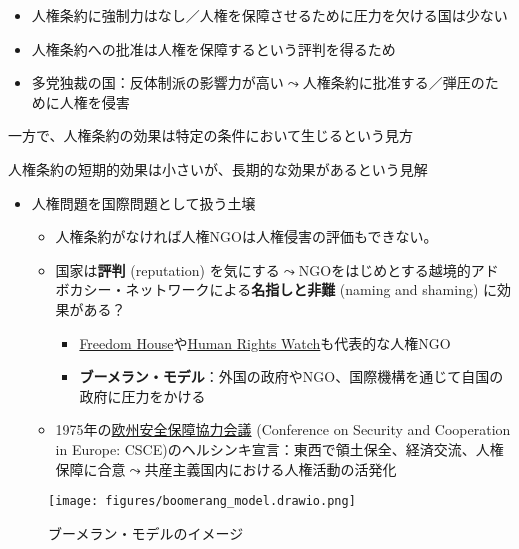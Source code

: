 \documentclass[
  xelatex,
  ja=standard]{bxjsarticle}
\providecommand{\tightlist}{%
  \setlength{\itemsep}{0pt}\setlength{\parskip}{0pt}}\usepackage{longtable,booktabs,array}
\begin{document}
\begin{itemize}
\tightlist
\item
  人権条約に強制力はなし／人権を保障させるために圧力を欠ける国は少ない
\item
  人権条約への批准は人権を保障するという評判を得るため
\item
  多党独裁の国：反体制派の影響力が高い\(\leadsto\)人権条約に批准する／弾圧のために人権を侵害
\end{itemize}

一方で、人権条約の効果は特定の条件において生じるという見方\citep{neumayer2005, murdie2012, conrad2013, lupu2013}

人権条約の短期的効果は小さいが、長期的な効果があるという見解\citep{hafner2007, tsutsui2012}

\begin{itemize}
\tightlist
\item
  人権問題を国際問題として扱う土壌

  \begin{itemize}
  \tightlist
  \item
    人権条約がなければ人権NGOは人権侵害の評価もできない。
  \item
    国家は\textbf{評判} (reputation)
    を気にする\(\leadsto\)NGOをはじめとする越境的アドボカシー・ネットワークによる\textbf{名指しと非難}
    (naming and shaming) に効果がある？\citep{hafner2008}

    \begin{itemize}
    \tightlist
    \item
      \href{https://freedomhouse.org/}{Freedom
      House}や\href{https://www.hrw.org/ja}{Human Rights
      Watch}も代表的な人権NGO
    \item
      \textbf{ブーメラン・モデル}：外国の政府やNGO、国際機構を通じて自国の政府に圧力をかける\citep{keck1999}
    \end{itemize}
  \item
    1975年の\href{https://www.mofa.go.jp/mofaj/area/osce/gaiyo.html}{欧州安全保障協力会議}
    (Conference on Security and Cooperation in Europe:
    CSCE)のヘルシンキ宣言：東西で領土保全、経済交流、人権保障に合意\(\leadsto\)共産主義国内における人権活動の活発化
  \end{itemize}
\end{itemize}

\begin{figure}[htpb]

{\centering \texttt{[image: figures/boomerang\_model.drawio.png]}

}

\caption{ブーメラン・モデルのイメージ}

\end{figure}
\end{document}
